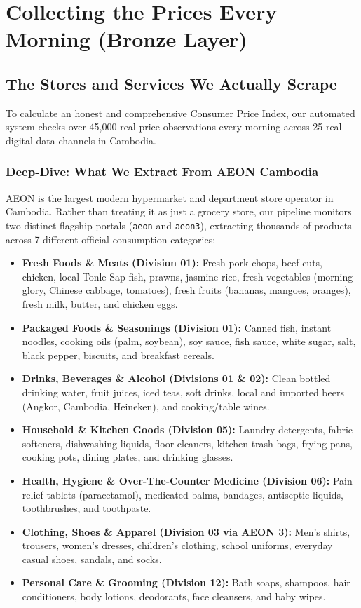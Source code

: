 \documentclass[11pt,a4paper,oneside]{article}
\begin{document}
\section{Collecting the Prices Every Morning (Bronze Layer)}

\subsection{The Stores and Services We Actually Scrape}
To calculate an honest and comprehensive Consumer Price Index, our automated system checks over 45,000 real price observations every morning across 25 real digital data channels in Cambodia. 

\subsubsection*{Deep-Dive: What We Extract From AEON Cambodia}
AEON is the largest modern hypermarket and department store operator in Cambodia. Rather than treating it as just a grocery store, our pipeline monitors two distinct flagship portals (\texttt{aeon} and \texttt{aeon3}), extracting thousands of products across 7 different official consumption categories:
\begin{itemize}[noitemsep]
    \item \textbf{Fresh Foods \& Meats (Division 01):} Fresh pork chops, beef cuts, chicken, local Tonle Sap fish, prawns, jasmine rice, fresh vegetables (morning glory, Chinese cabbage, tomatoes), fresh fruits (bananas, mangoes, oranges), fresh milk, butter, and chicken eggs.
    \item \textbf{Packaged Foods \& Seasonings (Division 01):} Canned fish, instant noodles, cooking oils (palm, soybean), soy sauce, fish sauce, white sugar, salt, black pepper, biscuits, and breakfast cereals.
    \item \textbf{Drinks, Beverages \& Alcohol (Divisions 01 \& 02):} Clean bottled drinking water, fruit juices, iced teas, soft drinks, local and imported beers (Angkor, Cambodia, Heineken), and cooking/table wines.
    \item \textbf{Household \& Kitchen Goods (Division 05):} Laundry detergents, fabric softeners, dishwashing liquids, floor cleaners, kitchen trash bags, frying pans, cooking pots, dining plates, and drinking glasses.
    \item \textbf{Health, Hygiene \& Over-The-Counter Medicine (Division 06):} Pain relief tablets (paracetamol), medicated balms, bandages, antiseptic liquids, toothbrushes, and toothpaste.
    \item \textbf{Clothing, Shoes \& Apparel (Division 03 via AEON 3):} Men's shirts, trousers, women's dresses, children's clothing, school uniforms, everyday casual shoes, sandals, and socks.
    \item \textbf{Personal Care \& Grooming (Division 12):} Bath soaps, shampoos, hair conditioners, body lotions, deodorants, face cleansers, and baby wipes.
\end{itemize}
\end{document}
